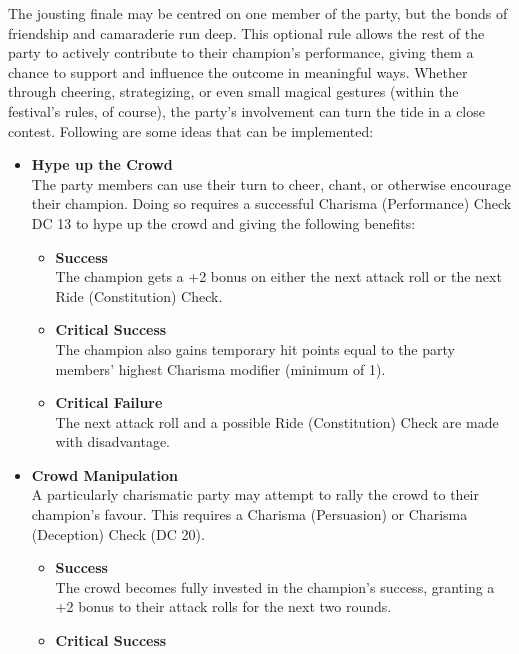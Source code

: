 {\entryfont The jousting finale may be centred on one member of the party, but the bonds of friendship and camaraderie run deep. This optional rule allows the rest of the party to actively contribute to their champion's performance, giving them a chance to support and influence the outcome in meaningful ways. Whether through cheering, strategizing, or even small magical gestures (within the festival's rules, of course), the party's involvement can turn the tide in a close contest. Following are some ideas that can be implemented:
\begin{itemize}
	\renewcommand\labelitemi{\textbf{\textbullet}}
	\item \textbf{Hype up the Crowd}\\
	The party members can use their turn to cheer, chant, or otherwise encourage their champion. Doing so requires a successful Charisma (Performance) Check DC 13 to hype up the crowd and giving the following benefits:
	\begin{itemize}
		\renewcommand\labelitemii{\textbf{\textbullet}}
		\item \textbf{Success}\\
		The champion gets a +2 bonus on either the next attack roll or the next Ride (Constitution) Check.
		\item \textbf{Critical Success}\\
		The champion also gains temporary hit points equal to the party members' highest Charisma modifier (minimum of 1).
		\item \textbf{Critical Failure}\\
		The next attack roll and a possible Ride (Constitution) Check are made with disadvantage.
	\end{itemize}
\end{itemize}
\vfill\eject
\begin{itemize}
	\renewcommand\labelitemi{\textbf{\textbullet}}
	\item \textbf{Crowd Manipulation}\\
	A particularly charismatic party may attempt to rally the crowd to their champion's favour. This requires a Charisma (Persuasion) or Charisma (Deception) Check (DC 20).
	\begin{itemize}
		\renewcommand\labelitemii{\textbf{\textbullet}}
		\item \textbf{Success}\\
		The crowd becomes fully invested in the champion's success, granting a +2 bonus to their attack rolls for the next two rounds.
		\item \textbf{Critical Success}\\

\end{itemize}
\end{itemize}}
